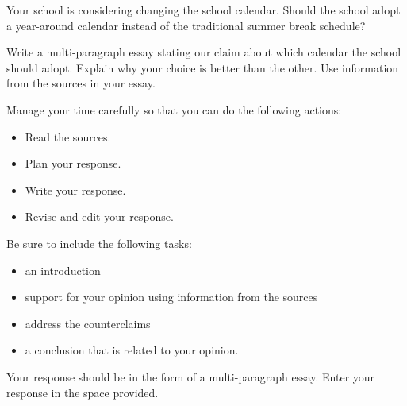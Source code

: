 \documentclass[12pt]{article}
\begin{document}
\vspace{1em}
\begin{tcolorbox}[colframe=black!60, colback=white, 
coltitle=black, colbacktitle=black!15, fonttitle=\bfseries\Large, 
title=Example Test Prompt, halign title=center, left=10pt, right=10pt, top=10pt, bottom=15pt]
Your school is considering changing the school calendar. Should the school adopt a year-around calendar instead of the traditional summer break schedule?

Write a multi-paragraph essay stating our claim about which calendar the school should adopt. Explain why your choice is better than the other. Use information from the sources in your essay.

Manage your time carefully so that you can do the following actions:
\begin{itemize}
    \item Read the sources.
    \item Plan your response.
    \item Write your response.
    \item Revise and edit your response.
\end{itemize}
Be sure to include the following tasks:
\begin{itemize}
    \item an introduction
    \item support for your opinion using information from the sources
    \item address the counterclaims
    \item a conclusion that is related to your opinion.
\end{itemize}
Your response should be in the form of a multi-paragraph essay. Enter your response in the space provided.
\end{tcolorbox}

\vspace{1em}
\end{document}
